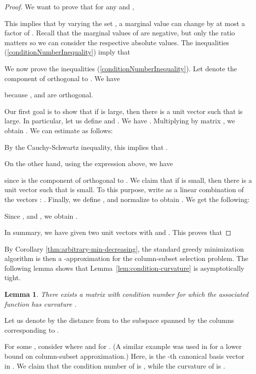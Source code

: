 \documentclass{article}
\newtheorem{lemma}[theorem]{Lemma}
\theoremstyle{definition}
\begin{document}
\begin{proof}
We want to prove that for any  and , 

This implies that by varying the set , a marginal value can change by at most a factor of . 
Recall that the marginal values of  are negative, but only the ratio matters so we can consider the respective absolute values. 
The inequalities (\ref{conditionNumberInequality}) imply that 


We now prove the  inequalities (\ref{conditionNumberInequality}). Let  denote the component of  orthogonal to .
We have

because ,  and  are orthogonal.


Our first goal is to show that if   is large, then there is a unit vector  such that  is large. In particular, let us define  and . We have . Multiplying by matrix , we obtain . We can estimate  as follows:

By the Cauchy-Schwartz inequality, this implies that .

On the other hand, using the expression above, we have

since  is the component of  orthogonal to .
We claim that if  is small, then there is a unit vector  such that  is small. To this purpose, write  as a linear combination of the vectors : . Finally, we define , and normalize to obtain .
We get the following:

Since , and , we obtain .

In summary, we have given two unit vectors  with  and .
This proves that 
\end{proof}

By Corollary \ref{thm:arbitrary-min-decreasing}, the standard greedy minimization algorithm is then a -approximation for the column-subset selection problem.
The following lemma shows that Lemma~\ref{lem:condition-curvature} is asymptotically tight.

\begin{lemma}
There exists a matrix  with condition number  for which the associated function  has curvature .
\end{lemma}

Let us denote by  the distance from  to the subspace spanned by the columns corresponding to .




For some , consider  where  and  for .
(A similar example was used in \cite{Boutsidis2014} for a lower bound on column-subset approximation.) Here,  is the -th canonical basis vector in . We claim that the condition number of  is , while the curvature of  is .
\end{document}
